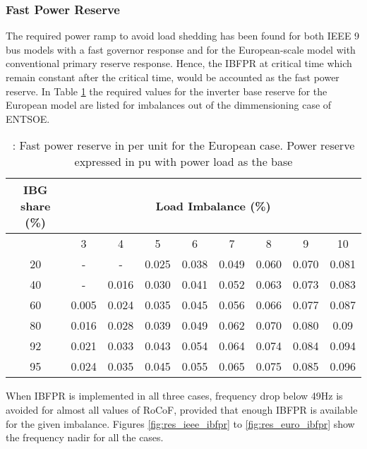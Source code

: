 \subsubsection{Fast Power Reserve}


The required power ramp  to avoid load shedding has been found for both IEEE 9 bus models with a fast governor response and for the European-scale model  with conventional primary reserve response. Hence, the IBFPR at critical time which remain constant after the critical time, would be accounted as the fast power reserve. In Table \ref{tb:crpowr} the required values for the inverter base reserve for the European model are listed for imbalances out of the dimmensioning case of ENTSOE.

\begin{table}[h]
	\caption{\label{tb:crpowr}: Fast power reserve in per unit for the European case. Power reserve expressed in pu with power load as the base}
	\centering
	\begin{tabular}{*9c}
		\toprule
		\textbf{IBG share (\%)}	& \multicolumn{8}{c}{\textbf{Load Imbalance (\%)}} \\
		\midrule
		{} & 3&	4&	5&	6&	7&	8&	9	&10 \\
		\midrule
		20&	-&	-&	0.025&	0.038&	0.049&	0.060&	0.070&	0.081\\
		40&	-&	0.016&	0.030&	0.041&	0.052&	0.063&	0.073&	0.083\\
		60&	0.005&	0.024&	0.035&	0.045&	0.056&	0.066&	0.077&	0.087\\
		80&	0.016&	0.028&	0.039&	0.049&	0.062&	0.070&	0.080&	0.09\\
		92&	0.021&	0.033&	0.043&	0.054&	0.064&	0.074&	0.084&	0.094\\
		95&	0.024&	0.035&	0.045&	0.055&	0.065&	0.075&	0.085&	0.096\\
		\bottomrule
	\end{tabular}
\end{table}

When IBFPR is implemented in all three cases, frequency drop below 49Hz is avoided for almost all values of RoCoF, provided that enough IBFPR is available for the given imbalance. Figures \ref{fig:res_ieee_ibfpr} to \ref{fig:res_euro_ibfpr} show the frequency nadir for all the cases.\\

